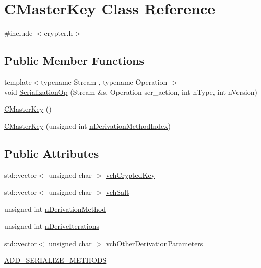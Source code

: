 \hypertarget{class_c_master_key}{}\section{C\+Master\+Key Class Reference}
\label{class_c_master_key}


{\ttfamily \#include $<$crypter.\+h$>$}

\subsection*{Public Member Functions}
\begin{DoxyCompactItemize}
\item 
{\footnotesize template$<$typename Stream , typename Operation $>$ }\\void \hyperlink{class_c_master_key_a32456e3080cf3a9818850f3c458594ea}{Serialization\+Op} (Stream \&s, Operation ser\+\_\+action, int n\+Type, int n\+Version)
\item 
\hyperlink{class_c_master_key_a267244f9eaaf6ef5a71cb2faa393cdea}{C\+Master\+Key} ()
\item 
\hyperlink{class_c_master_key_a61d5165940d981ef97f0120160737a05}{C\+Master\+Key} (unsigned int \hyperlink{main_8h_a3e3a4daba510b75f09387695c6c8a11f}{n\+Derivation\+Method\+Index})
\end{DoxyCompactItemize}
\subsection*{Public Attributes}
\begin{DoxyCompactItemize}
\item 
std\+::vector$<$ unsigned char $>$ \hyperlink{class_c_master_key_ab52e0eaabb0eb3af78fc4879c192e163}{vch\+Crypted\+Key}
\item 
std\+::vector$<$ unsigned char $>$ \hyperlink{class_c_master_key_a00009f4b4feaa2ebe630a0d7cc854d3a}{vch\+Salt}
\item 
unsigned int \hyperlink{class_c_master_key_a7a4b1e432a30011297f496441769957f}{n\+Derivation\+Method}
\item 
unsigned int \hyperlink{class_c_master_key_aec53e0be82d1053cf5a70a67fd4cc25d}{n\+Derive\+Iterations}
\item 
std\+::vector$<$ unsigned char $>$ \hyperlink{class_c_master_key_abfd00b311d5e5cf9ae1a6f3877ed35f7}{vch\+Other\+Derivation\+Parameters}
\item 
\hyperlink{class_c_master_key_a0e49e2a9206051c91388b2077eacb8c8}{A\+D\+D\+\_\+\+S\+E\+R\+I\+A\+L\+I\+Z\+E\+\_\+\+M\+E\+T\+H\+O\+D\+S}
\end{DoxyCompactItemize}


